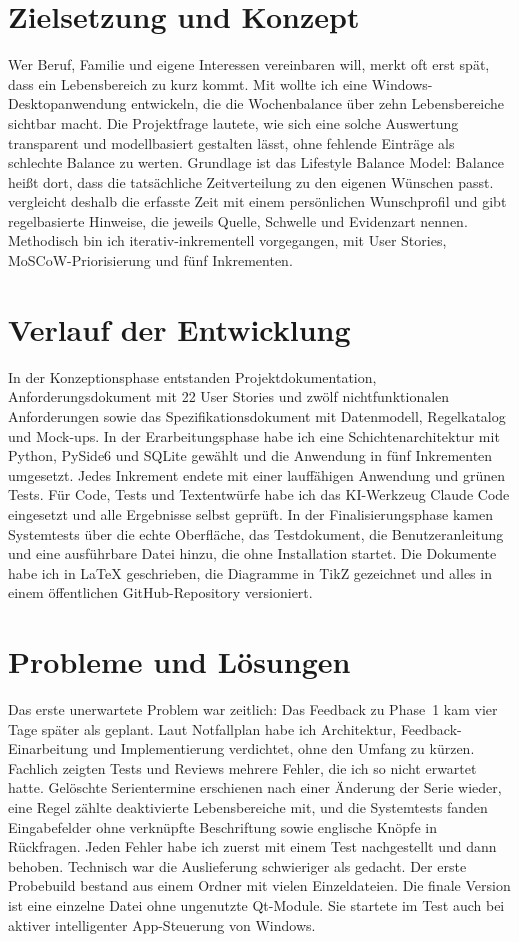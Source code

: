 \documentclass[abstract]{iu-pse}
\begin{document}
\titelblatt
\hauptteil

\section{Zielsetzung und Konzept}
Wer Beruf, Familie und eigene Interessen vereinbaren will, merkt oft erst spät, dass ein Lebensbereich zu kurz kommt. Mit \Projektname{} wollte ich eine Windows-Desktopanwendung entwickeln, die die Wochenbalance über zehn Lebensbereiche sichtbar macht. Die Projektfrage lautete, wie sich eine solche Auswertung transparent und modellbasiert gestalten lässt, ohne fehlende Einträge als schlechte Balance zu werten. Grundlage ist das Lifestyle Balance Model: Balance heißt dort, dass die tatsächliche Zeitverteilung zu den eigenen Wünschen passt. \Projektname{} vergleicht deshalb die erfasste Zeit mit einem persönlichen Wunschprofil und gibt regelbasierte Hinweise, die jeweils Quelle, Schwelle und Evidenzart nennen. Methodisch bin ich iterativ-inkrementell vorgegangen, mit User Stories, MoSCoW-Priorisierung und fünf Inkrementen.

\section{Verlauf der Entwicklung}
In der Konzeptionsphase entstanden Projektdokumentation, Anforderungsdokument mit 22 User Stories und zwölf nichtfunktionalen Anforderungen sowie das Spezifikationsdokument mit Datenmodell, Regelkatalog und Mock-ups. In der Erarbeitungsphase habe ich eine Schichtenarchitektur mit Python, PySide6 und SQLite gewählt und die Anwendung in fünf Inkrementen umgesetzt. Jedes Inkrement endete mit einer lauffähigen Anwendung und grünen Tests. Für Code, Tests und Textentwürfe habe ich das KI-Werkzeug Claude Code eingesetzt und alle Ergebnisse selbst geprüft. In der Finalisierungsphase kamen Systemtests über die echte Oberfläche, das Testdokument, die Benutzeranleitung und eine ausführbare Datei hinzu, die ohne Installation startet. Die Dokumente habe ich in LaTeX geschrieben, die Diagramme in TikZ gezeichnet und alles in einem öffentlichen GitHub-Repository versioniert.

\section{Probleme und Lösungen}
Das erste unerwartete Problem war zeitlich: Das Feedback zu Phase~1 kam vier Tage später als geplant. Laut Notfallplan habe ich Architektur, Feedback-Einarbeitung und Implementierung verdichtet, ohne den Umfang zu kürzen. Fachlich zeigten Tests und Reviews mehrere Fehler, die ich so nicht erwartet hatte. Gelöschte Serientermine erschienen nach einer Änderung der Serie wieder, eine Regel zählte deaktivierte Lebensbereiche mit, und die Systemtests fanden Eingabefelder ohne verknüpfte Beschriftung sowie englische Knöpfe in Rückfragen. Jeden Fehler habe ich zuerst mit einem Test nachgestellt und dann behoben. Technisch war die Auslieferung schwieriger als gedacht. Der erste Probebuild bestand aus einem Ordner mit vielen Einzeldateien. Die finale Version ist eine einzelne Datei ohne ungenutzte Qt-Module. Sie startete im Test auch bei aktiver intelligenter App-Steuerung von Windows.
\end{document}
